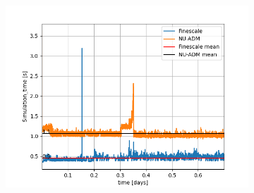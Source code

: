 \documentclass[professionalfont]{beamer}
\begin{document}
\begin{frame}{\FrameProblemName}
\begin{figure}[!htbp]
        \label{fig:fig4_pr4}
    \end{figure}
\end{frame}

\begin{frame}{\FrameProblemName}
    \begin{figure}[!htbp]
        \centering
        \caption{Tempos de simulação}
        \begin{subfigure}{.48\textwidth}
            \centering
            \includegraphics[scale=0.4]{./imgs/pr4/tempo_sim_cr5.png}

\end{subfigure}
\end{figure}
\end{frame}
\end{document}

